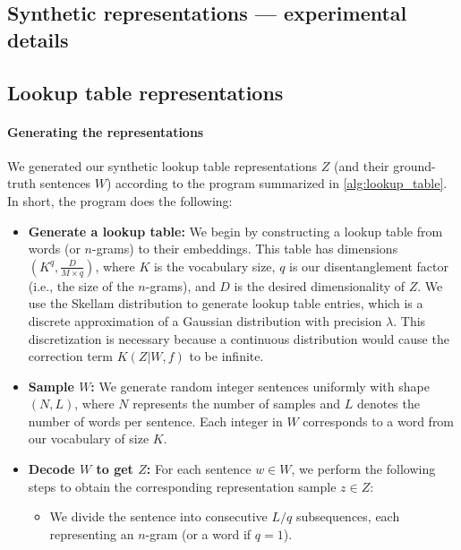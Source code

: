 \documentclass{article} %
\begin{document}
\begin{appendices}
\section{Synthetic representations --- experimental details}
\label{sec:synthetic_details}

\subsection{Lookup table representations}

\paragraph{Generating the representations}

We generated our synthetic lookup table representations $Z$ (and their ground-truth sentences $W$) according to the program summarized in \cref{alg:lookup_table}. In short, the program does the following:

\begin{itemize}
    \item \textbf{Generate a lookup table:}
    We begin by constructing a lookup table from words (or $n$-grams) to their embeddings. This table has dimensions $(K^q, \frac{D}{M \times q})$, where $K$ is the vocabulary size, $q$ is our disentanglement factor (i.e., the size of the $n$-grams), and $D$ is the desired dimensionality of $Z$. We use the Skellam distribution to generate lookup table entries, which is a discrete approximation of a Gaussian distribution with precision $\lambda$. This discretization is necessary because a continuous distribution would cause the correction term $K(Z|W,f)$ to be infinite.
    
    \item \textbf{Sample $W$:}
    We generate random integer sentences uniformly with shape $(N, L)$, where $N$ represents the number of samples and $L$ denotes the number of words per sentence. Each integer in $W$ corresponds to a word from our vocabulary of size $K$.
    
    \item \textbf{Decode $W$ to get $Z$:}
    For each sentence $w \in W$, we perform the following steps to obtain the corresponding representation sample $z \in Z$:
    \begin{itemize}
        \item We divide the sentence into consecutive $L/q$ subsequences, each representing an $n$-gram (or a word if $q=1$).
        

\end{itemize}
\end{itemize}
\end{appendices}
\end{document}
